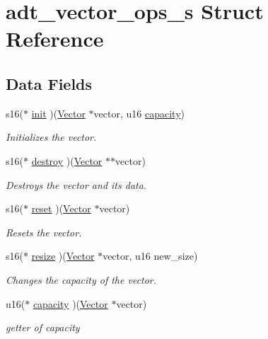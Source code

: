 \hypertarget{structadt__vector__ops__s}{}\section{adt\+\_\+vector\+\_\+ops\+\_\+s Struct Reference}
\label{structadt__vector__ops__s}
\subsection*{Data Fields}
\begin{DoxyCompactItemize}
\item 
s16($\ast$ \hyperlink{structadt__vector__ops__s_a3af2d52d5fe73b7755a0c816ed974caf}{init} )(\hyperlink{structadt__vector__s}{Vector} $\ast$vector, u16 \hyperlink{structadt__vector__ops__s_a41c9de03c40660dfbd699958ae366738}{capacity})
\begin{DoxyCompactList}\small\item\em Initializes the vector. \end{DoxyCompactList}\item 
s16($\ast$ \hyperlink{structadt__vector__ops__s_ad7824912241e23089f2230471ecd4f36}{destroy} )(\hyperlink{structadt__vector__s}{Vector} $\ast$$\ast$vector)
\begin{DoxyCompactList}\small\item\em Destroys the vector and it\textquotesingle{}s data. \end{DoxyCompactList}\item 
s16($\ast$ \hyperlink{structadt__vector__ops__s_a46a0e410956a547eaeffccaab227b280}{reset} )(\hyperlink{structadt__vector__s}{Vector} $\ast$vector)
\begin{DoxyCompactList}\small\item\em Resets the vector. \end{DoxyCompactList}\item 
s16($\ast$ \hyperlink{structadt__vector__ops__s_a682fe6403089259f5317763665b1faa7}{resize} )(\hyperlink{structadt__vector__s}{Vector} $\ast$vector, u16 new\+\_\+size)
\begin{DoxyCompactList}\small\item\em Changes the capacity of the vector. \end{DoxyCompactList}\item 
u16($\ast$ \hyperlink{structadt__vector__ops__s_a41c9de03c40660dfbd699958ae366738}{capacity} )(\hyperlink{structadt__vector__s}{Vector} $\ast$vector)
\begin{DoxyCompactList}\small\item\em getter of capacity \end{DoxyCompactList}\item 
$$
\end{DoxyCompactItemize}
